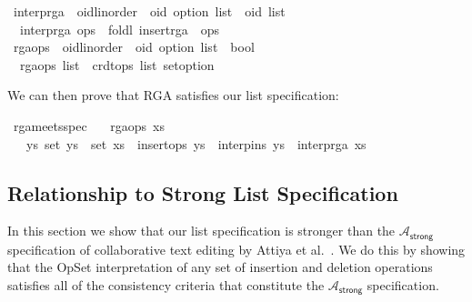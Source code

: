 \begin{isabelle}
\isanewline
{}\isamarkupfalse%
\ interp{\isacharunderscore}rga\ {\isacharcolon}{\isacharcolon}\ {\isachardoublequoteopen}{\isacharparenleft}{\isacharprime}oid{\isacharcolon}{\isacharcolon}{\isacharbraceleft}linorder{\isacharbraceright}\ {\isasymtimes}\ {\isacharprime}oid\ option{\isacharparenright}\ list\ {\isasymRightarrow}\ {\isacharprime}oid\ list{\isachardoublequoteclose}\ \isanewline
\ \ {\isachardoublequoteopen}interp{\isacharunderscore}rga\ ops\ {\isasymequiv}\ foldl\ insert{\isacharunderscore}rga\ {\isacharbrackleft}{\isacharbrackright}\ ops{\isachardoublequoteclose}\isanewline
\isanewline
{}\isamarkupfalse%
\ rga{\isacharunderscore}ops\ {\isacharcolon}{\isacharcolon}\ {\isachardoublequoteopen}{\isacharparenleft}{\isacharprime}oid{\isacharcolon}{\isacharcolon}{\isacharbraceleft}linorder{\isacharbraceright}\ {\isasymtimes}\ {\isacharprime}oid\ option{\isacharparenright}\ list\ {\isasymRightarrow}\ bool{\isachardoublequoteclose}\ \isanewline
\ \ {\isachardoublequoteopen}rga{\isacharunderscore}ops\ list\ {\isasymequiv}\ crdt{\isacharunderscore}ops\ list\ set{\isacharunderscore}option{\isachardoublequoteclose}
\end{isabelle}

\noindent We can then prove that RGA satisfies our list specification:
\begin{isabelle}
\isamarkupfalse%
\ rga{\isacharunderscore}meets{\isacharunderscore}spec{\isacharcolon}\isanewline
\ \ \ {\isachardoublequoteopen}rga{\isacharunderscore}ops\ xs{\isachardoublequoteclose}\isanewline
\ \ \ {\isachardoublequoteopen}{\isasymexists}ys{\isachardot}\ set\ ys\ {\isacharequal}\ set\ xs\ {\isasymand}\ insert{\isacharunderscore}ops\ ys\ {\isasymand}\ interp{\isacharunderscore}ins\ ys\ {\isacharequal}\ interp{\isacharunderscore}rga\ xs{\isachardoublequoteclose}
\end{isabelle}


\subsection{Relationship to Strong List Specification}\label{appendix:attiya-spec}

In this section we show that our list specification is stronger than the $\mathcal{A}_\textsf{strong}$ specification of collaborative text editing by Attiya et al.~\cite{Attiya:2016kh}.
We do this by showing that the OpSet interpretation of any set of insertion and deletion operations satisfies all of the consistency criteria that constitute the $\mathcal{A}_\textsf{strong}$ specification.

